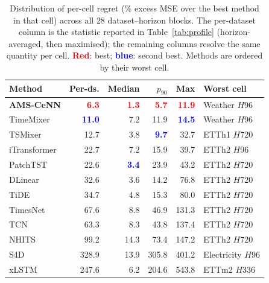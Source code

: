 \begin{table}[tb]
\centering
\caption{Distribution of per-cell regret (\% excess MSE over the best method in that cell) across all $28$ dataset--horizon blocks. The per-dataset column is the statistic reported in Table~\ref{tab:profile} (horizon-averaged, then maximised); the remaining columns resolve the same quantity per cell. \textcolor{red}{\textbf{Red}}: best; \textcolor{blue}{\textbf{blue}}: second best. Methods are ordered by their worst cell.}
\label{tab:regret28}
\footnotesize
\setlength{\tabcolsep}{4pt}
\begin{tabular}{lrrrrl}
\toprule
Method & Per-ds. & Median & $p_{90}$ & Max & Worst cell \\
\midrule
\textbf{AMS-CeNN} & \textcolor{red}{\textbf{6.3}} & \textcolor{red}{\textbf{1.3}} & \textcolor{red}{\textbf{5.7}} & \textcolor{red}{\textbf{11.9}} & Weather $H$96 \\
TimeMixer & \textcolor{blue}{\textbf{11.0}} & 7.2 & 11.9 & \textcolor{blue}{\textbf{14.5}} & Weather $H$96 \\
TSMixer & 12.7 & 3.8 & \textcolor{blue}{\textbf{9.7}} & 32.7 & ETTh1 $H$720 \\
iTransformer & 22.7 & 7.2 & 15.9 & 39.7 & ETTh2 $H$96 \\
PatchTST & 22.6 & \textcolor{blue}{\textbf{3.4}} & 23.9 & 43.2 & ETTh2 $H$720 \\
DLinear & 32.6 & 3.6 & 14.2 & 76.8 & ETTh2 $H$720 \\
TiDE & 34.7 & 4.8 & 15.3 & 80.0 & ETTh2 $H$720 \\
TimesNet & 67.6 & 8.8 & 46.9 & 131.3 & ETTh2 $H$720 \\
TCN & 63.3 & 8.3 & 43.8 & 137.4 & ETTh2 $H$720 \\
NHITS & 99.2 & 14.3 & 73.4 & 147.2 & ETTh2 $H$720 \\
S4D & 328.9 & 13.9 & 305.8 & 401.2 & Electricity $H$96 \\
xLSTM & 247.6 & 6.2 & 204.6 & 543.8 & ETTm2 $H$336 \\
\bottomrule
\end{tabular}
\end{table}
